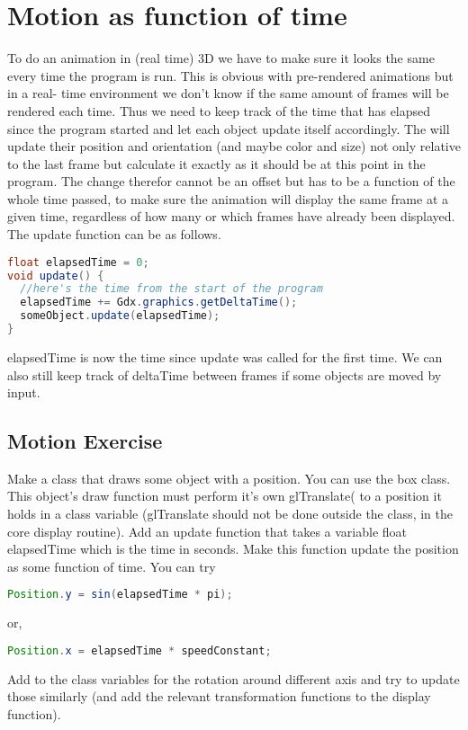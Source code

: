 \documentclass[12pt]{article}
\begin{document}
\section{Motion as function of time}
To do an animation in (real time) 3D we have to make sure it looks the same every
time the program is run. This is obvious with pre-rendered animations but in a real-
time environment we don't know if the same amount of frames will be rendered
each time. Thus we need to keep track of the time that has elapsed since the
program started and let each object update itself accordingly. The will update their
position and orientation (and maybe color and size) not only relative to the last
frame but calculate it exactly as it should be at this point in the program. The change
therefor cannot be an offset but has to be a function of the whole time passed, to
make sure the animation will display the same frame at a given time, regardless of
how many or which frames have already been displayed.
The update function can be as follows.
\begin{lstlisting}[frame=single, language=Java, basicstyle=\footnotesize\ttfamily]
float elapsedTime = 0;
void update() {
  //here's the time from the start of the program
  elapsedTime += Gdx.graphics.getDeltaTime();
  someObject.update(elapsedTime);
}
\end{lstlisting}
elapsedTime is now the time since update was called for the first time. We can also
still keep track of deltaTime between frames if some objects are moved by input.

\subsection{Motion Exercise}
Make a class that draws some object with a position. You can use the box class. This object's draw function
must perform it's own glTranslate( to a position it holds in a class variable
(glTranslate should not be done outside the class, in the core display routine).
Add an update function that takes a variable float elapsedTime which is the time in
seconds. Make this function update the position as some function of time.
You can try
\begin{lstlisting}[frame=single, language=Java, basicstyle=\footnotesize\ttfamily]
Position.y = sin(elapsedTime * pi);
\end{lstlisting}
or,
\begin{lstlisting}[frame=single, language=Java, basicstyle=\footnotesize\ttfamily]
Position.x = elapsedTime * speedConstant;
\end{lstlisting}
Add to the class variables for the rotation around different axis and try to update
those similarly (and add the relevant transformation functions to the display
function).
\end{document}
